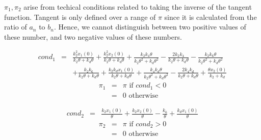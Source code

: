 \documentclass{bmcart}
\begin{document}
$\pi_1, \pi_2$ arise from techical conditions related to taking the
inverse of the tangent function.
Tangent is only defined over a range of $\pi$ since it is calculated
from the ratio of $a_n$ to $b_n$.
Hence, we cannot distinguish between two positive values of these number,
and two negative values of these numbers.

\begin{eqnarray*}
cond_1 & = &
\frac{k_{2}^{2} x_1 (0)}{k_{2} \theta + k_{d} \theta} + \frac{k_{2}^{2} x_2 (0)}{k_{2} \theta + k_{d} \theta} + \frac{k_{2} k_{4} \theta}{k_{2} \theta^{2} + k_{d} \theta^{2}} - \frac{2 k_{2} k_{4}}{k_{2} \theta + k_{d} \theta}
- \frac{k_{2} k_{6} \theta}{k_{2} \theta^{2} + k_{d} \theta^{2}}  \\
& &
+ \frac{k_{2} k_{6}}{k_{2} \theta + k_{d} \theta} + \frac{k_{2} k_{d} x_1 (0)}{k_{2} \theta + k_{d} \theta} + \frac{k_{4} k_{d} \theta}{k_{2} \theta^{2} + k_{d} \theta^{2}} - \frac{2 k_{4} k_{d}}{k_{2} \theta + k_{d} \theta} + \frac{\theta x_2 (0)}{k_{2} + k_{d}}
\end{eqnarray*}
\begin{eqnarray*}
\pi_1 & = & \pi \text{ if } cond_1 < 0 \\
& = & 0 \text { otherwise}
\end{eqnarray*}

\begin{eqnarray*}
cond_2 &  = &  \frac{k_{2} x_1 (0)}{\theta} + \frac{k_{2} x_2 (0)}{\theta} - \frac{k_{6}}{\theta} + \frac{k_{d} x_1 (0)}{\theta}
\end{eqnarray*}
\begin{eqnarray*}
\pi_2 & = & \pi \text{ if } cond_2 > 0 \\
& = & 0 \text { otherwise}
\end{eqnarray*}


\end{document}
